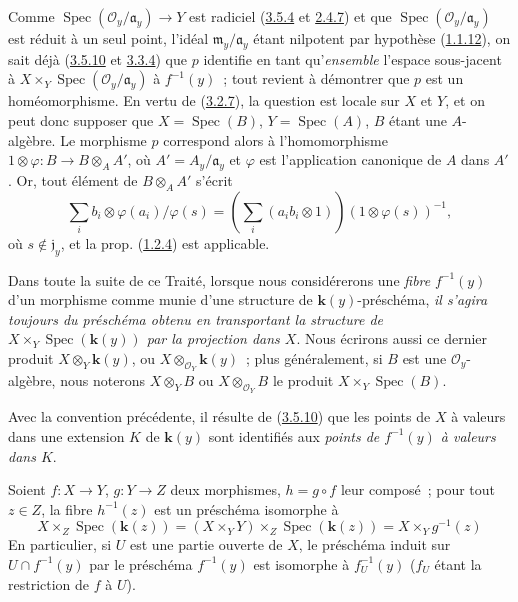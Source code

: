 Comme $\operatorname{Spec}(\mathcal{O}_y/\mathfrak{a}_y)\to Y$ est radiciel
(\hyperref[I.3.5.4-fr]{3.5.4} et \hyperref[I.2.4.7-fr]{2.4.7}) et que
$\operatorname{Spec}(\mathcal{O}_y/\mathfrak{a}_y)$ est réduit à un seul
point, l'idéal $\mathfrak{m}_y/\mathfrak{a}_y$ étant nilpotent par hypothèse
(\hyperref[I.1.1.12-fr]{1.1.12}), on sait déjà
(\hyperref[I.3.5.10-fr]{3.5.10} et \hyperref[I.3.3.4-fr]{3.3.4}) que $p$
identifie en tant qu'\emph{ensemble} l'espace sous-jacent à
$X\times_Y\operatorname{Spec}(\mathcal{O}_y/\mathfrak{a}_y)$ à $f^{-1}(y)$~;
tout revient à démontrer que $p$ est un homéomorphisme. En vertu de
(\hyperref[I.3.2.7-fr]{3.2.7}), la question est locale sur $X$ et $Y$, et on
peut donc supposer que $X=\operatorname{Spec}(B)$,
$Y=\operatorname{Spec}(A)$, $B$ étant une $A$-algèbre. Le morphisme $p$
correspond alors à l'homomorphisme
$1\otimes\varphi:B\to B\otimes_A A'$, où $A'=A_y/\mathfrak{a}_y$ et
$\varphi$ est l'application canonique de $A$ dans $A'$. Or, tout élément de
$B\otimes_A A'$ s'écrit
\label{I.3.6.1.localization-fraction-fr}
\[
  \sum_i b_i\otimes\varphi(a_i)/\varphi(s)
  =\left(\sum_i(a_i b_i\otimes 1)\right)(1\otimes\varphi(s))^{-1},
\]
où $s\notin\mathfrak{j}_y$, et la prop.
(\hyperref[I.1.2.4-fr]{1.2.4}) est applicable.

\begin{env}[3.6.2]
\label{I.3.6.2-fr}
Dans toute la suite de ce Traité, lorsque nous considérerons une \emph{fibre}
$f^{-1}(y)$ d'un morphisme comme munie d'une structure de $\boldsymbol{k}(y)$-préschéma,
\emph{il s'agira toujours du préschéma obtenu en transportant la structure de
$X\times_Y\operatorname{Spec}(\boldsymbol{k}(y))$ par la projection dans $X$}. Nous
écrirons aussi ce dernier produit $X\otimes_Y \boldsymbol{k}(y)$, ou
$X\otimes_{\mathcal{O}_Y}\boldsymbol{k}(y)$~; plus généralement, si $B$ est une
$\mathcal{O}_y$-algèbre, nous noterons $X\otimes_Y B$ ou
$X\otimes_{\mathcal{O}_Y}B$ le produit
$X\times_Y\operatorname{Spec}(B)$.
\end{env}

Avec la convention précédente, il résulte de
(\hyperref[I.3.5.10-fr]{3.5.10}) que les points de $X$ à valeurs dans une
extension $K$ de $\boldsymbol{k}(y)$ sont identifiés aux \emph{points de $f^{-1}(y)$ à
valeurs dans $K$}.

\begin{env}[3.6.3]
\label{I.3.6.3-fr}
Soient $f:X\to Y$, $g:Y\to Z$ deux morphismes, $h=g\circ f$ leur composé~;
pour tout $z\in Z$, la fibre $h^{-1}(z)$ est un préschéma isomorphe à
\label{I.3.6.3.fibre-composition-fr}
\[
  X\times_Z\operatorname{Spec}(\boldsymbol{k}(z))
  =(X\times_Y Y)\times_Z\operatorname{Spec}(\boldsymbol{k}(z))
  =X\times_Y g^{-1}(z)
\]
En particulier, si $U$ est une partie ouverte de $X$, le préschéma induit sur
$U\cap f^{-1}(y)$ par le préschéma $f^{-1}(y)$ est isomorphe à
$f_U^{-1}(y)$ ($f_U$ étant la restriction de $f$ à $U$).
\end{env}

